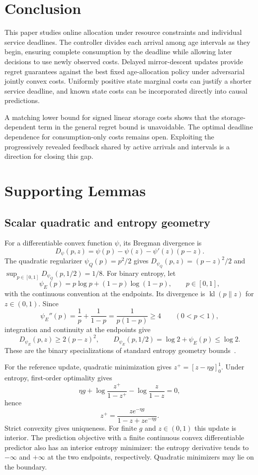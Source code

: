 \documentclass[11pt]{article}
\theoremstyle{plain}
\theoremstyle{remark}
\numberwithin{equation}{section}
\begin{document}
\section{Conclusion}
\label{ch6:sec:conclusion}

This paper studies online allocation under resource constraints and
individual service deadlines. The controller divides each arrival among
age intervals as they begin, ensuring complete consumption by the deadline
while allowing later decisions to use newly observed costs. Delayed
mirror-descent updates provide regret guarantees against the best fixed
age-allocation policy under adversarial jointly convex costs. Uniformly
positive state marginal costs can justify a shorter service deadline, and
known state costs can be incorporated directly into causal predictions.

A matching lower bound for signed linear storage costs shows that the
storage-dependent term in the general regret bound is unavoidable. The
optimal deadline dependence for consumption-only costs remains open.
Exploiting the progressively revealed feedback shared by active arrivals
and intervals is a direction for closing this gap.

\appendix
\section{Supporting Lemmas}

\subsection{Scalar quadratic and entropy geometry}
\label{app:geometry}

For a differentiable convex function $\psi$, its Bregman divergence is
\[
 D_\psi(p,z)=\psi(p)-\psi(z)-\psi'(z)(p-z).
\]
The quadratic regularizer $\psi_Q(p)=p^2/2$ gives
$D_{\psi_Q}(p,z)=(p-z)^2/2$ and
$\sup_{p\in[0,1]}D_{\psi_Q}(p,1/2)=1/8$.
For binary entropy, let
\[
 \psi_E(p)=p\log p+(1-p)\log(1-p),\qquad p\in[0,1],
\]
with the continuous convention at the endpoints. Its divergence is
$\operatorname{kl}(p\|z)$ for $z\in(0,1)$.
Since
\[
 \psi_E''(p)=\frac1p+\frac1{1-p}
 =\frac1{p(1-p)}\ge4\qquad(0<p<1),
\]
integration and continuity at the endpoints give
\[
 D_{\psi_E}(p,z)\ge2(p-z)^2,\qquad
 D_{\psi_E}(p,1/2)=\log2+\psi_E(p)\le\log2.
\]
These are the binary specializations of standard entropy geometry
bounds~\cite{BECK2003167}.

For the reference update, quadratic minimization gives
$z^+=[z-\eta g]_0^1$. Under entropy, first-order optimality gives
\[
 \eta g+\log\frac{z^+}{1-z^+}-\log\frac z{1-z}=0,
\]
hence
\[
 z^+=\frac{z e^{-\eta g}}{1-z+z e^{-\eta g}}.
\]
Strict convexity gives uniqueness. For finite $g$ and $z\in(0,1)$ this
update is interior. The prediction objective with a finite continuous
convex differentiable predictor also has an interior entropy minimizer:
the entropy derivative tends to $-\infty$ and $+\infty$ at the two
endpoints, respectively. Quadratic minimizers may lie on the boundary.
\end{document}

